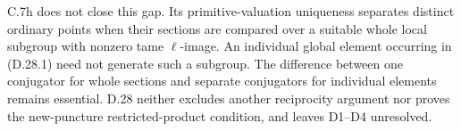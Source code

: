 C.7h does not close this gap. Its primitive-valuation uniqueness
separates distinct ordinary points when their sections are compared
over a suitable whole local subgroup with nonzero tame
$\ell$-image. An individual global element occurring in (D.28.1)
need not generate such a subgroup. The difference between one
conjugator for whole sections and separate conjugators for individual
elements remains essential. D.28 neither excludes another
reciprocity argument nor proves the new-puncture restricted-product
condition, and leaves D1--D4 unresolved.
